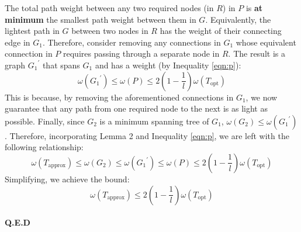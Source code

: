     The total path weight between any two required nodes (in $R$) in $P$ is \textbf{at minimum} the smallest path weight between them in $G$.
    Equivalently, the lightest path in $G$ between two nodes in $R$ has the weight of their connecting edge in $G_1$.
    Therefore, consider removing any connections in $G_1$ whose equivalent connection in $P$ requires passing through a separate node in $R$.
    The result is a graph ${G_1}^\prime$ that spans $G_1$ and has a weight (by Inequality \ref{eqn:p}): 
    \[\omega{({G_1}^\prime)} \le \omega{(P)} \le 2(1 - \frac{1}{l})\omega{(T_{\text{opt}})}\]
    This is because, by removing the aforementioned connections in $G_1$, we now guarantee that any path from one required node to the next is as light as possible.
    Finally, since $G_2$ is a minimum spanning tree of $G_1$, $\omega{(G_2)} \le \omega{({G_1}^\prime)}$.
    Therefore, incorporating Lemma 2 and Inequality \ref{eqn:p}, we are left with the following relationship:
    \[\omega{(T_{\text{approx}})} \le \omega{(G_2)} \le \omega{({G_1}^\prime)} \le \omega{(P)} \le 2(1 - \frac{1}{l})\omega{(T_{\text{opt}})}\]
    Simplifying, we achieve the bound:
    \[\omega{(T_{\text{approx}})} \le 2(1 - \frac{1}{l})\omega{(T_{\text{opt}})}\]\\

    \textbf{Q.E.D}